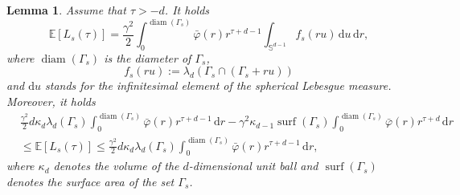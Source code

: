 \documentclass{article}
\newtheorem{lemma}[theorem]{Lemma}
\theoremstyle{definition}
\numberwithin{equation}{section}
\theoremstyle{remark}
\begin{document}
\begin{lemma} \label{lem:expectedlength}
    Assume that $\tau > -d$. It holds
    $$ \mathbb{E}[L_s (\tau)]= \frac{\gamma^2}{2} \int_0^{\operatorname{diam}(\Gamma_s)} \bar{\varphi} (r) r^{\tau + d -1} \int_{\mathbb{S}^{d-1}
} f_s (r u) \, \mathrm{d}u \, \mathrm{d}r,$$
where $\operatorname{diam}(\Gamma_s)$ is the diameter of $\Gamma_s$,
$$f_s (ru) := \lambda_d \left( \Gamma_s \cap (\Gamma_s + ru) \right)$$
and $\mathrm{d}u$ stands for the infinitesimal element of the spherical Lebesgue measure. Moreover, it holds
\begin{align*}
    & \frac{\gamma^2}{2} d \kappa_d \lambda_d(\Gamma_s) \int_0^{\operatorname{diam}(\Gamma_s)} \bar{\varphi} (r) r^{\tau + d -1} \, \mathrm{d}r -\gamma^2\kappa_{d-1} \operatorname{surf}(\Gamma_s) \int_0^{\operatorname{diam}(\Gamma_s)} \bar{\varphi} (r) r^{\tau + d } \, \mathrm{d}r\\
    & \leq \mathbb{E}[L_s (\tau)] \leq \frac{\gamma^2}{2} d \kappa_d \lambda_d(\Gamma_s) \int_0^{\operatorname{diam}(\Gamma_s)} \bar{\varphi} (r) r^{\tau + d -1} \, \mathrm{d}r,
\end{align*}
where $\kappa_d$ denotes the volume of the $d$-dimensional unit ball and $\operatorname{surf}(\Gamma_s)$ denotes the surface area of the set  $\Gamma_s$.
\end{lemma}
\end{document}
